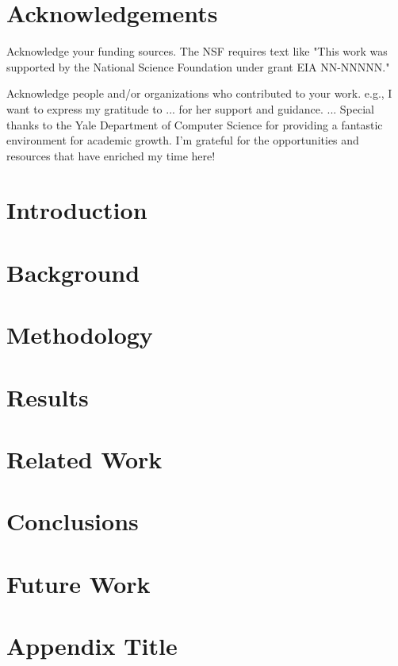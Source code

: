 \documentclass[12pt,twoside]{report}
\begin{document}


\chapter*{Acknowledgements}
Acknowledge your funding sources. The NSF requires text like "This work was supported by the National Science Foundation under grant EIA NN-NNNNN."

Acknowledge people and/or organizations who contributed to your work. 
e.g., I want to express my gratitude to ... for her support and guidance. ...  Special thanks to the Yale Department of Computer Science for providing a fantastic environment for academic growth. I'm grateful for the opportunities and resources that have enriched my time here!

{
  \hypersetup{linkcolor=black}
  \tableofcontents
}

\clearpage




\chapter{Introduction}


\chapter{Background} \label{ch:background}


\chapter{Methodology} \label{ch:methodology}



\chapter{Results} \label{ch:results}


\chapter{Related Work} \label{ch:relatedwork}


\chapter{Conclusions} \label{ch:conclusion}


\chapter{Future Work} \label{ch:futurework}



\printbibliography

\appendix
\chapter{Appendix Title} \label{ch:appendices}
 
\end{document}
